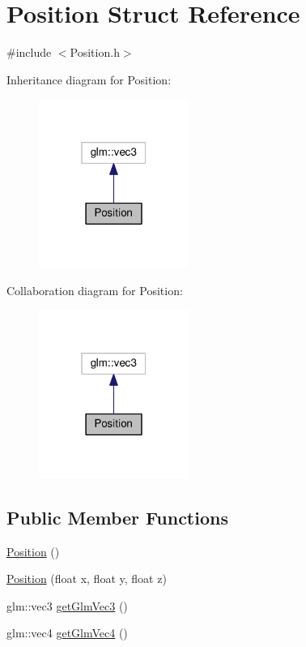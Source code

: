 \hypertarget{struct_position}{}\section{Position Struct Reference}
\label{struct_position}


{\ttfamily \#include $<$Position.\+h$>$}



Inheritance diagram for Position\+:
\nopagebreak
\begin{figure}[H]
\begin{center}
\leavevmode
\includegraphics[width=139pt]{struct_position__inherit__graph}
\end{center}
\end{figure}


Collaboration diagram for Position\+:
\nopagebreak
\begin{figure}[H]
\begin{center}
\leavevmode
\includegraphics[width=139pt]{struct_position__coll__graph}
\end{center}
\end{figure}
\subsection*{Public Member Functions}
\begin{DoxyCompactItemize}
\item 
\hyperlink{struct_position_a369a577425f8ba02e8750d04b6a088db}{Position} ()
\item 
\hyperlink{struct_position_a75943ebda3e14f1b03a833745ccf9861}{Position} (float x, float y, float z)
\item 
glm\+::vec3 \hyperlink{struct_position_aaccc6084d199c1f5fd4a325df73caff8}{get\+Glm\+Vec3} ()
\item 
glm\+::vec4 \hyperlink{struct_position_a25a2270a1b1e0a97f0aa3a0ed37c5007}{get\+Glm\+Vec4} ()
\end{DoxyCompactItemize}


